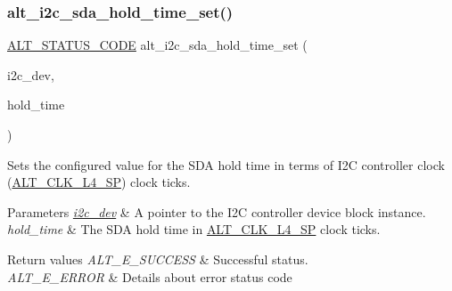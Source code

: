 \subsubsection{\texorpdfstring{alt\_i2c\_sda\_hold\_time\_set()}{alt\_i2c\_sda\_hold\_time\_set()}}
{\footnotesize\ttfamily \mbox{\hyperlink{hwlib_8h_abdb0d369f069723ca55d6c94bcaaaa12}{A\+L\+T\+\_\+\+S\+T\+A\+T\+U\+S\+\_\+\+C\+O\+DE}} alt\+\_\+i2c\+\_\+sda\+\_\+hold\+\_\+time\+\_\+set (\begin{DoxyParamCaption}\item[{\mbox{\hyperlink{structALT__I2C__DEV__s}{A\+L\+T\+\_\+\+I2\+C\+\_\+\+D\+E\+V\+\_\+t}} $\ast$}]{i2c\+\_\+dev,  }\item[{const uint16\+\_\+t}]{hold\+\_\+time }\end{DoxyParamCaption})}

Sets the configured value for the S\+DA hold time in terms of I2C controller clock (\mbox{\hyperlink{group__CLK__MGR_gga931510957187a22cb4e6adef8d9d105aae9f1cc0f4be2861d830cb5e38daec823}{A\+L\+T\+\_\+\+C\+L\+K\+\_\+\+L4\+\_\+\+SP}}) clock ticks.


\begin{DoxyParams}{Parameters}
{\em \mbox{\hyperlink{structi2c__dev}{i2c\+\_\+dev}}} & A pointer to the I2C controller device block instance.\\
\hline
{\em hold\+\_\+time} & The S\+DA hold time in \mbox{\hyperlink{group__CLK__MGR_gga931510957187a22cb4e6adef8d9d105aae9f1cc0f4be2861d830cb5e38daec823}{A\+L\+T\+\_\+\+C\+L\+K\+\_\+\+L4\+\_\+\+SP}} clock ticks.\\
\hline
\end{DoxyParams}

\begin{DoxyRetVals}{Return values}
{\em A\+L\+T\+\_\+\+E\+\_\+\+S\+U\+C\+C\+E\+SS} & Successful status. \\
\hline
{\em A\+L\+T\+\_\+\+E\+\_\+\+E\+R\+R\+OR} & Details about error status code \\
\hline
\end{DoxyRetVals}

